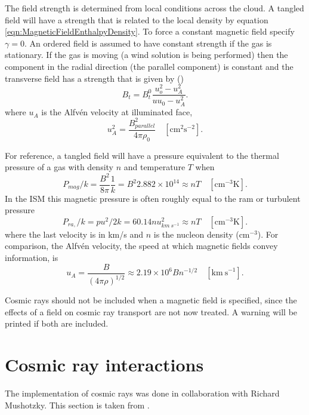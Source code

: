 The field strength is determined from local conditions across the cloud.
A tangled field will have a strength that is related to the local density
by equation \ref{eqn:MagneticFieldEnthalpyDensity}.
To force a constant magnetic field specify $\gamma = 0$.
An ordered
field is assumed to have constant strength if the gas is stationary.
If
the gas is moving (a wind solution is being performed) then the component
in the radial direction (the parallel component) is constant and the
transverse field has a strength that is given by (\citealp{Cowling1976})
\begin{equation}
{B_t} = B_t^0\frac{{u_o^2 - u_A^2}}{{u{u_0} - u_A^2}}.
\end{equation}
where $u_A^{}$
 is the Alfv\'en velocity at illuminated face,
\begin{equation}
u_A^2 = \frac{{B_{parallel}^2}}{{4\pi {\rho _0}}}
\quad  [\mathrm{cm}^2 \mathrm{s}^{-2}].
\end{equation}

For reference, a tangled field will have a pressure equivalent to the
thermal pressure of a gas with density $n$ and temperature $T$ when
\begin{equation}
P_{mag}/k=\frac{B^2}{8\pi} \frac{1}{k} = B^2 2.882\times 10^{14}\approx nT
\quad  [\mathrm{cm}^{-3} \mathrm{K}].
\end{equation}
In the ISM this magnetic pressure is often roughly equal to the ram or
turbulent pressure
\begin{equation}
P_{ra,}/k=pu^2 / 2k=60.14 nu_{km~s^{-1}}^2 \approx nT
\quad [\mathrm{cm}^{-3} \mathrm{K}].
\end{equation}
where the last velocity is in km/s and $n$ is the nucleon density (cm$^{-3}$).
For comparison, the Alfv\'en velocity, the speed at which magnetic fields
convey information, is
\begin{equation}
u_A = \frac{B}{(4\pi \rho)^{1/2}} \approx 2.19 \times 10^6B n^{-1/2}
\quad [\mathrm{km~s}^{-1}].
\end{equation}

Cosmic rays should not be included when a magnetic field is specified,
since the effects of a field on cosmic ray transport are not now treated.
A warning will be printed if both are included.

\section{Cosmic ray interactions}

The implementation of cosmic rays was done in collaboration with Richard
Mushotzky.
This section is taken from \citet{FerlandMushotzky1984}.

